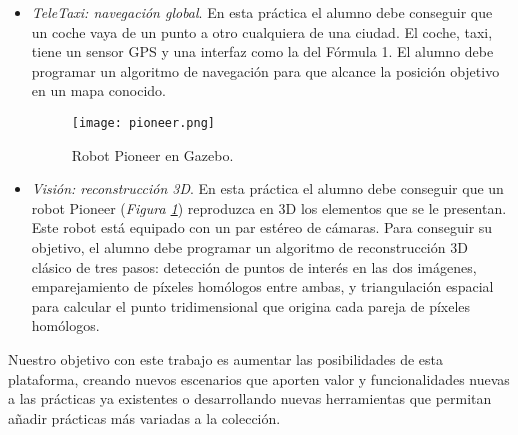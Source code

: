 \begin{itemize}
	\item \textit{TeleTaxi: navegación global}. En esta práctica el alumno debe conseguir que un coche vaya de un punto a otro cualquiera de una ciudad. El coche, taxi, tiene un sensor GPS y una interfaz como la del Fórmula 1. El alumno debe programar un algoritmo de navegación para que alcance la posición objetivo en un mapa conocido.

\begin{figure}[h]
	\centering\texttt{[image: pioneer.png]}
	\caption{Robot Pioneer en Gazebo.}
	\label{fig:pioneer}
\end{figure}
	
	\item \textit{Visión: reconstrucción 3D}. En esta práctica el alumno debe conseguir que un robot Pioneer (\textit{Figura \ref{fig:pioneer}}) reproduzca en 3D los elementos que se le presentan. Este robot está equipado con un par estéreo de cámaras. Para conseguir su objetivo, el alumno debe programar un algoritmo de reconstrucción 3D clásico de tres pasos: detección de puntos de interés en las dos imágenes, emparejamiento de píxeles homólogos entre ambas, y triangulación espacial para calcular el punto tridimensional que origina cada pareja de píxeles homólogos.
\end{itemize}

Nuestro objetivo con este trabajo es aumentar las posibilidades de esta plataforma, creando nuevos escenarios que aporten valor y funcionalidades nuevas a las prácticas ya existentes o desarrollando nuevas herramientas que permitan añadir prácticas más variadas a la colección.

